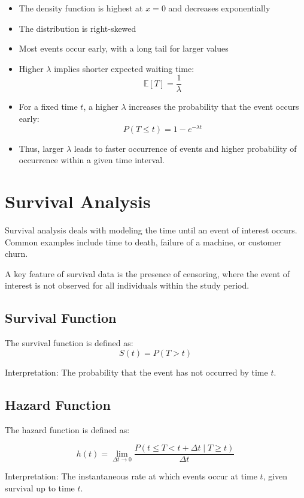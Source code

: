 \documentclass[10pt,a4paper]{article}
\begin{document}
		\begin{itemize}
		    \item The density function is highest at $x=0$ and decreases exponentially
		    \item The distribution is right-skewed
		    \item Most events occur early, with a long tail for larger values
		    \item Higher $\lambda$ implies shorter expected waiting time:
		    \[
		    \mathbb{E}[T] = \frac{1}{\lambda}
		    \]
		    
		    \item For a fixed time $t$, a higher $\lambda$ increases the probability that the event occurs early:
		    \[
		    P(T \le t) = 1 - e^{-\lambda t}
		    \]
		    
		    \item Thus, larger $\lambda$ leads to faster occurrence of events and higher probability of occurrence within a given time interval.
		\end{itemize}
		


\section{Survival Analysis}
Survival analysis deals with modeling the time until an event of interest occurs. Common examples include time to death, failure of a machine, or customer churn.

A key feature of survival data is the presence of censoring, where the event of interest is not observed for all individuals within the study period.

\subsection{Survival Function}
The survival function is defined as:
\[
S(t) = P(T > t)
\]


Interpretation: The probability that the event has not occurred by time $t$.
	
	
\subsection{Hazard Function}

The hazard function is defined as:

\[
h(t) = \lim_{\Delta t \to 0} \frac{P(t \leq T < t + \Delta t \mid T \geq t)}{\Delta t}
\]

Interpretation: The instantaneous rate at which events occur at time $t$, given survival up to time $t$.
\end{document}
